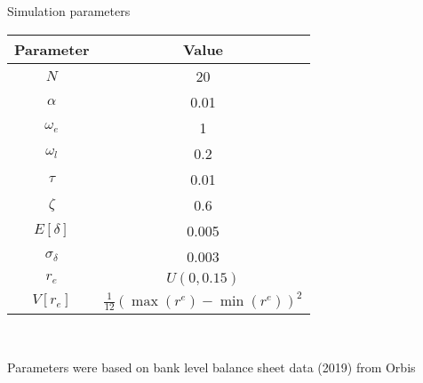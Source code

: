 \documentclass{beamer}
\begin{document}
\begin{frame}{Simulation parameters}

    \begin{table}
    \begin{center}
        \begin{tabular}{|c c|} 
         \hline
         Parameter & Value\\ [0.3ex] 
         \hline\hline
         $N$ & 20 \\ 
         \hline
         $\alpha$ & 0.01 \\
         \hline
         $\omega_e$ & 1 \\
         \hline
         $\omega_l$ & 0.2\\
         \hline
         $\tau$ & 0.01 \\ 
         \hline
         $\zeta$ & 0.6 \\ 
         \hline
         $E[\delta]$ & 0.005 \\
         \hline
         $\sigma_\delta$ & 0.003 \\ 
         \hline
         $r_e$ & $U(0, 0.15)$ \\ 
         \hline
         $V[r_e]$ & $\frac{1}{12}(\max(r^e) - \min(r^e))^2$ \\  [1ex] 
         \hline
        \end{tabular}
    \end{center}

    \

    Parameters were based on bank level balance sheet data (2019) from Orbis

\end{table}
    

\end{frame}
\end{document}

